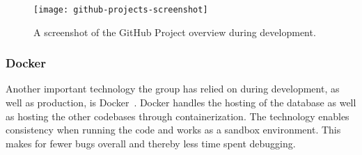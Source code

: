 \begin{figure}[h]
    \centering
    \texttt{[image: github-projects-screenshot]}
    \caption{A screenshot of the GitHub Project overview during development.
    }\label{fig:github-projects-screenshot}
\end{figure}

\subsubsection{Docker}

Another important technology the group has relied on during development, as well as production, is
Docker~\cite{docker2024}.
Docker handles the hosting of the database as well as hosting the other codebases through containerization.
The technology enables consistency when running the code and works as a sandbox environment.
This makes for fewer bugs overall and thereby less time spent debugging.
